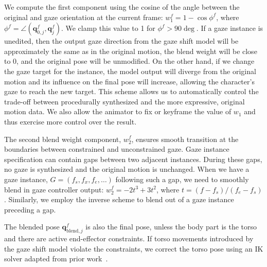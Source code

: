 We compute the first component using the cosine of the angle between the original and gaze orientation at the current frame: $w_1^f = 1 - \cos \phi^f$, where $\phi^f = \angle(\mathbf{q}_{0,j}^f, \mathbf{q}_j^f)$. We clamp this value to 1 for $\phi^f > 90 \deg$. If a gaze instance is unedited, then the output gaze direction from the gaze shift model will be approximately the same as in the original motion, the blend weight will be close to 0, and the original pose will be unmodified. On the other hand, if we change the gaze target for the instance, the model output will diverge from the original motion and its influence on the final pose will increase, allowing the character's gaze to reach the new target. This scheme allows us to automatically control the trade-off between procedurally synthesized and the more expressive, original motion data. We also allow the animator to fix or keyframe the value of $w_1$ and thus exercise more control over the result.

The second blend weight component, $w_2^f$, ensures smooth transition at the boundaries between constrained and unconstrained gaze. Gaze instance specification can contain gaps between two adjacent instances. During these gaps, no gaze is synthesized and the original motion is unchanged. When we have a gaze instance, $G = (f_s, f_x, f_e, \ldots)$ following such a gap, we need to smoothly blend in gaze controller output: $w_2^f = -2 t^3 + 3 t^2$, where $t = (f - f_s)/(f_e - f_s)$. Similarly, we employ the inverse scheme to blend out of a gaze instance preceding a gap.

The blended pose $\mathbf{q}_{\mathrm{blend},j}^f$ is also the final pose, unless the body part is the torso and there are active end-effector constraints. If torso movements introduced by the gaze shift model violate the constraints, we correct the torso pose using an IK solver adapted from prior work~\citep{shin2001puppetry}. 